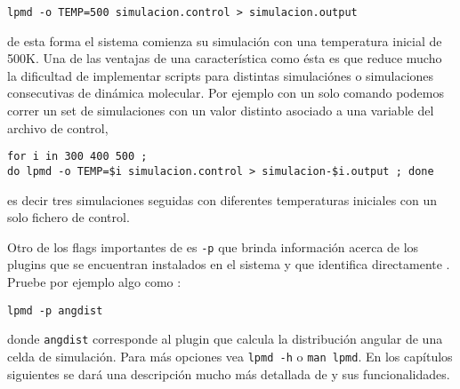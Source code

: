 \begin{center}
 \texttt{lpmd -o TEMP=500 simulacion.control > simulacion.output}
\end{center}

de esta forma el sistema comienza su simulaci\'on con una temperatura inicial de 500K. Una de las ventajas de una caracter\'istica como \'esta es que reduce mucho la dificultad de implementar scripts para distintas simulaci\'ones o simulaciones consecutivas de din\'amica molecular. Por ejemplo con un solo comando podemos correr un set de simulaciones con un valor distinto asociado a una variable del archivo de control,

\begin{center}
 \texttt{for i in 300 400 500 ; \\do lpmd -o TEMP=\$i simulacion.control > simulacion-\$i.output ; done}
\end{center}

es decir tres simulaciones seguidas con diferentes temperaturas iniciales con un solo fichero de control.


Otro de los flags importantes de \lpmd es \verb|-p| que brinda informaci\'on acerca de los plugins que se encuentran instalados en el sistema y que identifica directamente \lpmd. Pruebe por ejemplo algo como :

\begin{center}
 \texttt{lpmd -p angdist}
\end{center}

donde \verb|angdist| corresponde al plugin que calcula la distribuci\'on angular de una celda de simulaci\'on. Para m\'as opciones vea \verb|lpmd -h| o \verb|man lpmd|. En los cap\'itulos siguientes se dar\'a una descripci\'on mucho m\'as detallada de \lpmd y sus funcionalidades.
